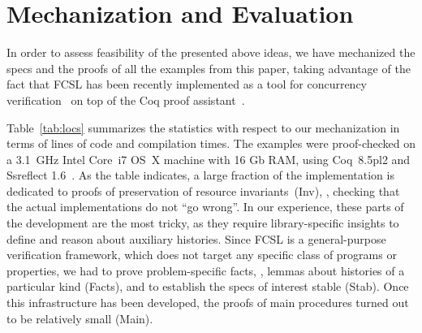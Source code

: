 
\section{Mechanization and Evaluation}
\label{sec:evaluation}

%

In order to assess feasibility of the presented above ideas, we have
mechanized the specs and the proofs of all the examples from this
paper, taking advantage of the fact that FCSL has been recently
implemented as a tool for concurrency
verification~\cite{Sergey-al:PLDI15} on top of the Coq proof
assistant~\cite{Coq-manual}.

Table~\ref{tab:locs} summarizes the statistics with respect to our
mechanization in terms of lines of code and compilation times. 
%
The examples were proof-checked on a 3.1~GHz Intel Core~i7 OS~X
machine with 16 Gb RAM, using Coq~8.5pl2 and Ssreflect
1.6~\cite{Gonthier-al:TR}.
%
As the table indicates, a large fraction of the implementation is
dedicated to proofs of preservation of resource
invariants~(\textsf{Inv}), \ie, checking that the actual
implementations do not ``go wrong''.
%
In our experience, these parts of the development are the most tricky,
as they require library-specific insights to define and reason about
auxiliary histories.
%
Since FCSL is a general-purpose verification framework, which does not
target any specific class of programs or properties, we had to prove
problem-specific facts, \eg, lemmas about histories of a particular
kind (\textsf{Facts}), and to establish the specs of interest stable
(\textsf{Stab}). Once this infrastructure has been developed, the
proofs of main procedures turned out to be relatively small
(\textsf{Main}).
%
%

